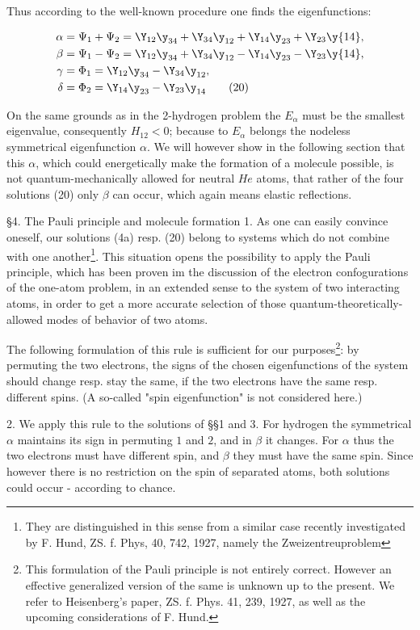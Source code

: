 \documentclass{article}
\newcommand{\nequ}[2]{
\begin{align*}
#1
\tag{#2}
\end{align*}
}
\begin{document}
Thus according to the well-known procedure one finds the eigenfunctions:
\nequ{
\alpha &= \Psi_1 + \Psi_2 = \Y_{12}\y_{34} + \Y_{34}\y_{12} + \Y_{14}\y_{23} + \Y_{23}\y{14},\\
\beta  &= \Psi_1 - \Psi_2 = \Y_{12}\y_{34} + \Y_{34}\y_{12} - \Y_{14}\y_{23} - \Y_{23}\y{14},\\
\gamma &= \Phi_1 = \Y_{12}\y_{34} - \Y_{34}\y_{12},\\
\delta &= \Phi_2 = \Y_{14}\y_{23} - \Y_{23}\y_{14}
}{20}

On the same grounds as in the 2-hydrogen problem the $E_\alpha$ must be the smallest eigenvalue, consequently $H_{12} < 0$; because to $E_\alpha$ belongs the nodeless symmetrical eigenfunction $\alpha$. We will however show in the following section that this $\alpha$, which could energetically make the formation of a molecule possible, is not quantum-mechanically allowed for neutral $He$ atoms, that rather of the four solutions (20) only $\beta$ can occur, which again means elastic reflections.

§4. The Pauli principle and molecule formation
1. As one can easily convince oneself, our solutions (4a) resp. (20) belong to systems which do not combine with one another\footnote{They are distinguished in this sense from a similar case recently investigated by F. Hund, ZS. f. Phys, 40, 742, 1927, namely the Zweizentreuproblem}. This situation opens the possibility to apply the Pauli principle, which has been proven im the discussion of the electron confogurations of the one-atom problem, in an extended sense to the system of two interacting atoms, in order to get a more accurate selection of those quantum-theoretically-allowed modes of behavior of two atoms.

The following formulation of this rule is sufficient for our purposes\footnote{This formulation of the Pauli principle is not entirely correct. However an effective generalized version of the same is unknown up to the present. We refer to Heisenberg's paper, ZS. f. Phys. 41, 239, 1927, as well as the upcoming considerations of F. Hund.}: by permuting the two electrons, the signs of the chosen eigenfunctions of the system should change resp. stay the same, if the two electrons have the same resp. different spins. (A so-called "spin eigenfunction" is not considered here.)

2. We apply this rule to the solutions of §§1 and 3. For hydrogen the symmetrical $\alpha$ maintains its sign in permuting $1$ and $2$, and in $\beta$ it changes. For $\alpha$ thus the two electrons must have different spin, and $\beta$ they must have the same spin. Since however there is no restriction on the spin of separated atoms, both solutions could occur - according to chance.
\end{document}
